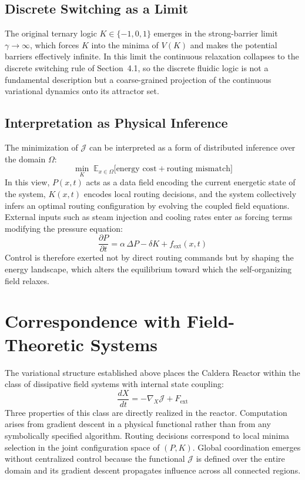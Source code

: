 \documentclass[12pt, a4paper]{article}
\begin{document}
\subsection{Discrete Switching as a Limit}

The original ternary logic $K \in \{-1, 0, 1\}$ emerges in the strong-barrier limit $\gamma \to \infty$, which forces $K$ into the minima of $V(K)$ and makes the potential barriers effectively infinite. In this limit the continuous relaxation collapses to the discrete switching rule of Section~4.1, so the discrete fluidic logic is not a fundamental description but a coarse-grained projection of the continuous variational dynamics onto its attractor set.

\subsection{Interpretation as Physical Inference}

The minimization of $\mathcal{J}$ can be interpreted as a form of distributed inference over the domain $\Omega$:
\[
\min_{K} \;\mathbb{E}_{x \in \Omega}
\bigl[
\text{energy cost} + \text{routing mismatch}
\bigr]
\]
In this view, $P(x,t)$ acts as a data field encoding the current energetic state of the system, $K(x,t)$ encodes local routing decisions, and the system collectively infers an optimal routing configuration by evolving the coupled field equations. External inputs such as steam injection and cooling rates enter as forcing terms modifying the pressure equation:
\[
\frac{\partial P}{\partial t} = \alpha\, \Delta P - \delta K + f_{\text{ext}}(x,t)
\]
Control is therefore exerted not by direct routing commands but by shaping the energy landscape, which alters the equilibrium toward which the self-organizing field relaxes.

\section{Correspondence with Field-Theoretic Systems}

The variational structure established above places the Caldera Reactor within the class of dissipative field systems with internal state coupling:
\[
\frac{dX}{dt} = -\nabla_X \mathcal{J} + F_{\text{ext}}
\]
Three properties of this class are directly realized in the reactor. Computation arises from gradient descent in a physical functional rather than from any symbolically specified algorithm. Routing decisions correspond to local minima selection in the joint configuration space of $(P, K)$. Global coordination emerges without centralized control because the functional $\mathcal{J}$ is defined over the entire domain and its gradient descent propagates influence across all connected regions.
\end{document}
